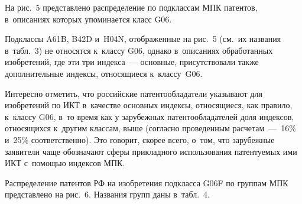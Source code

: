 \begin{multicols}{2}
  \vspace*{-3pt}
       
     На рис.~5 представлено распределение по подклассам МПК патентов, 
в~описаниях которых упоминается класс G06.


 Подклассы A61B, B42D и~H04N, 
отображенные на рис.~5 (см.\ их названия в~табл.~3) не относятся к~классу G06, 
однако в~описаниях обработанных изобретений, где эти три индекса~--- основные, 
присутствовали также дополнительные индексы, относящиеся к~классу~G06.
     
     Интересно отметить, что российские патентообладатели указывают для 
изобретений по ИКТ в~качестве основных индексы, относящиеся, как правило, 
к~классу G06, в~то время как у зарубежных патентообладателей доля индексов, 
относящихся к~другим классам, выше (согласно проведенным расчетам~---~16\% 
и~25\% соответственно). Это говорит, скорее всего, о~том, что зарубежные 
заявители чаще обозначают сферы прикладного использования патентуемых ими 
ИКТ с~помощью индексов МПК.
     

     

    
     Распределение патентов РФ на изобретения подкласса G06F по группам 
МПК представлено на рис.~6. Названия групп даны в~табл.~4.

\end{multicols}

\begin{figure*} %
 \vspace*{1pt}
 \begin{center}
 \mbox{%
 \epsfxsize=114.412mm
 }
 \end{center}
 \vspace*{-9pt}
     \end{figure*}




